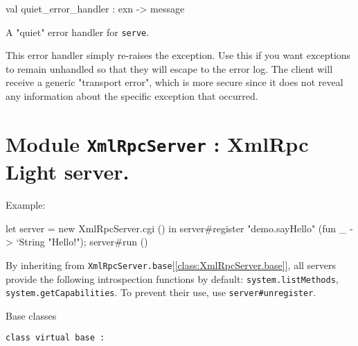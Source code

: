 \documentclass[11pt]{article}
\begin{document}
\label{val:XmlRpc.quiet-underscoreerror-underscorehandler}\begin{ocamldoccode}
val quiet_error_handler : exn -> message
\end{ocamldoccode}
\begin{ocamldocdescription}
A "quiet" error handler for {\tt{serve}}.


    This error handler simply re-raises the exception. Use this if you
    want exceptions to remain unhandled so that they will escape to the
    error log. The client will receive a generic "transport error",
    which is more secure since it does not reveal any information about
    the specific exception that occurred.


\end{ocamldocdescription}


\section{Module {\tt{XmlRpcServer}} : XmlRpc Light server.}
\label{module:XmlRpcServer}




\ocamldocvspace{0.5cm}



Example: \begin{ocamldoccode}

    let server = new XmlRpcServer.cgi () in
    server#register "demo.sayHello"
      (fun _ -> `String "Hello!");
    server#run () 
\end{ocamldoccode}



    By inheriting from {\tt{XmlRpcServer.base}}[\ref{class:XmlRpcServer.base}], all servers provide
    the following introspection functions by default: {\tt{system.listMethods}},
    {\tt{system.getCapabilities}}. To prevent their use, use {\tt{server\verb`#`unregister}}.



Base classes



\begin{ocamldoccode}
{\tt{class virtual base : }}\end{ocamldoccode}
\label{class:XmlRpcServer.base}
\end{document}
